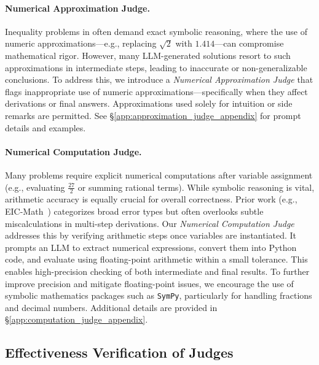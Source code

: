 \vspace{-3mm}
\paragraph{Numerical Approximation Judge.} Inequality problems in \dataset often demand exact symbolic reasoning, where the use of numeric approximations—e.g., replacing $\sqrt{2}$ with $1.414$—can compromise mathematical rigor. However, many LLM-generated solutions resort to such approximations in intermediate steps, leading to inaccurate or non-generalizable conclusions. To address this, we introduce a \textit{Numerical Approximation Judge} that flags inappropriate use of numeric approximations—specifically when they affect derivations or final answers. Approximations used solely for intuition or side remarks are permitted. See \S\ref{app:approximation_judge_appendix} for prompt details and examples. 

\vspace{-3mm}
\paragraph{Numerical Computation Judge.} Many \dataset problems require explicit numerical computations after variable assignment (e.g., evaluating $\frac{27}{2}$ or summing rational terms). While symbolic reasoning is vital, arithmetic accuracy is equally crucial for overall correctness. 
Prior work (e.g., EIC-Math~\cite{li2024evaluating}) categorizes broad error types but often overlooks subtle miscalculations in multi-step derivations.
Our \textit{Numerical Computation Judge} addresses this by verifying arithmetic steps once variables are instantiated. It prompts an LLM to extract numerical expressions, convert them into Python code, and evaluate using floating-point arithmetic within a small tolerance. This enables high-precision checking of both intermediate and final results. To further improve precision and mitigate floating-point issues, we encourage the use of symbolic mathematics packages such as \texttt{SymPy}, particularly for handling fractions and decimal numbers. Additional details are provided in \S\ref{app:computation_judge_appendix}.

\vspace{-3mm}
\subsection{Effectiveness Verification of Judges}
\label{sec:judge_verification}

